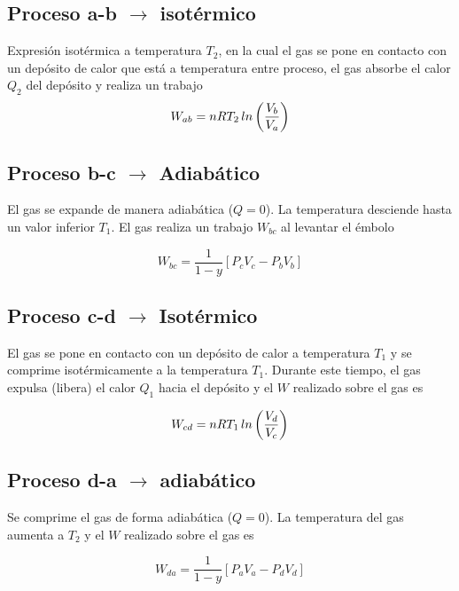 \documentclass[12pt,twocolumn,a4paper]{report}
\begin{document}
\subsection*{Proceso a-b $\rightarrow$ isotérmico  }
Expresión isotérmica a temperatura $T_2$, en la cual el gas se pone en contacto con un depósito de calor que está a temperatura entre proceso, el gas absorbe el calor $Q_2$ del depósito y realiza un trabajo $$W_{ab} = nRT_2 \thinspace ln\left(\dfrac{V_b}{V_a}\right)$$

\subsection*{Proceso b-c $\rightarrow$ Adiabático }
El gas se expande de manera adiabática ($Q = 0$). La temperatura desciende hasta un valor inferior $T_1$. El gas realiza un trabajo $W_{bc}$ al levantar el émbolo

$$ W_{bc} = \dfrac{1}{1-y} \left[ P_c V_c - P_b V_b \right] $$

\subsection*{Proceso c-d $\rightarrow$ Isotérmico }
El gas se pone en contacto con un depósito de calor a temperatura $T_1$ y se comprime isotérmicamente a la temperatura $T_1$. Durante este tiempo, el gas expulsa (libera) el calor $Q_1$ hacia el depósito y el $W$ realizado sobre el gas es 

$$ W_{cd} = nRT_1  \thinspace ln\left(\dfrac{V_d}{V_c}\right) $$

\subsection*{Proceso d-a $\rightarrow$ adiabático }
Se comprime el gas de forma adiabática ($Q=0$). La temperatura del gas aumenta a $T_2$ y el $W$ realizado sobre el gas es 

$$ W_{da} = \dfrac{1}{1-y} \left[ P_a V_a - P_d V_d \right] $$
\end{document}
